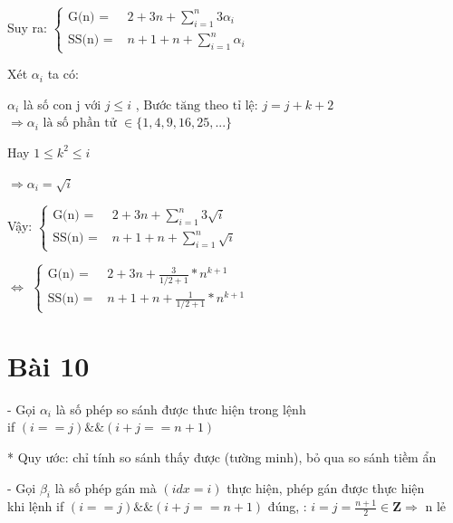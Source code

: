 \documentclass{article}
\newcommand\tab[1][1cm]{\hspace*{#1}}
\begin{document}
\tab Suy ra:
\(
\begin{cases}
    \text{G(n) = } & 2 + 3n +  \sum\limits_{i=1}^{n}3\alpha_{i} \\
    \text{SS(n) = } &  n + 1 + n  + \sum\limits_{i=1}^{n}\alpha_{i} 
\end{cases}
\)

\vspace{15mm}
Xét $\alpha_{i}$ ta có:

\tab $\alpha_{i}$ là số con j với $j \leq i $ , \(\text{Bước tăng theo tỉ lệ: } j = j + k + 2\)\\

\(\Rightarrow  \alpha_{i} \text{ là số phần tử } \in \{ 1, 4, 9, 16, 25, ...\}\) 
\vspace{5mm}

Hay $ 1 \leq k^2 \leq i$
\vspace{5mm}

\(\Rightarrow  \alpha_{i} = \sqrt{i}\)


\vspace{5mm}
\tab Vậy:
\(
\begin{cases}
    \text{G(n) = } & 2 + 3n +  \sum\limits_{i=1}^{n}3\sqrt{i} \\
    \text{SS(n) = } &  n + 1 + n  + \sum\limits_{i=1}^{n}\sqrt{i} 
\end{cases}
\)

\vspace{5mm}
\tab  $\Leftrightarrow $
\(
\begin{cases}
    \text{G(n) = } & 2 + 3n +  \frac{3}{1/2 + 1}*n^{k+1} \\

    \text{SS(n) = } &  n + 1 + n  + \frac{1}{1/2 + 1}*n^{k+1} 
\end{cases}
\)

\section*{Bài 10}

- Gọi $\alpha_{i}$ là số phép so sánh được thưc hiện trong lệnh\\
\tab  if $(i==j) \&\& (i + j == n +1 )$

* Quy ước: chỉ tính so sánh thấy được (tường minh), bỏ qua so sánh tiềm ẩn

- Gọi $\beta_{i} $ là số phép gán mà $(idx = i)$ thực hiện, phép gán được thực hiện\\
khi lệnh if $(i==j) \&\& (i + j == n +1 )$ đúng, : $ i = j = \frac{n+1}{2} \in \mathbf{Z} \Rightarrow$ n lẻ
\end{document}
